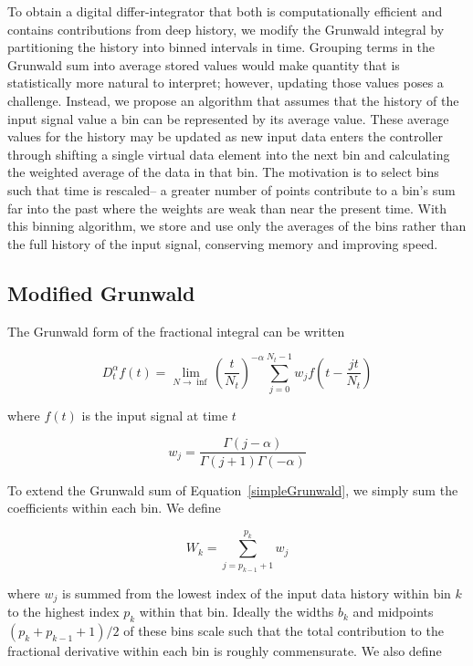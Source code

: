 


To obtain a digital differ-integrator that both is computationally efficient and contains contributions from deep history, we modify the Grunwald integral by partitioning the history into binned intervals in time. Grouping terms in the Grunwald sum into average stored values would make quantity that is statistically more natural to interpret; however, updating those values poses a challenge. Instead, we propose an algorithm that assumes that the history of the input signal value a bin can be represented by its average value. These average values for the history may be updated as new input data enters the controller through shifting a single virtual data element into the next bin and calculating the weighted average of the data in that bin. The motivation is to select bins such that time is rescaled-- a greater number of points contribute to a bin's sum far into the past where the weights are weak than near the present time.  With this binning algorithm, we store and use only the averages of the bins rather than the full history of the input signal, conserving memory and improving speed.

\subsection{Modified Grunwald}

The Grunwald form of the fractional integral can be written

\begin{equation}
D^\alpha_tf(t) = \displaystyle \lim_{N\rightarrow\inf} \left(\frac{t}{N_t}\right)^{-\alpha}
\displaystyle\sum\limits_{j=0}^{N_t-1} w_{j} f\left(t-\frac{j t}{N_t}\right)
\label{simpleGrunwald}
\end{equation}

\noindent where $f(t)$ is the input signal at time $t$

\begin{equation}
w_{j} = \frac{\Gamma(j-\alpha)}{\Gamma(j+1)\Gamma(-\alpha)}
\label{wj}
\end{equation}

\noindent To extend the Grunwald sum of Equation~\ref{simpleGrunwald}, we simply
sum the coefficients within each bin. We define

\begin{equation}
W_k = \displaystyle\sum\limits_{j=p_{k-1}+1}^{p_k} w_j
\label{sumWk}
\end{equation}

\noindent where $w_j$ is summed from the lowest index of the input data history within bin $k$ to the highest index $p_k$ within that bin. Ideally the widths $b_k$ and midpoints $(p_{k}+p_{k-1}+1)/2$  of these bins scale such that the total contribution to the fractional derivative within each bin is roughly commensurate. We also define


